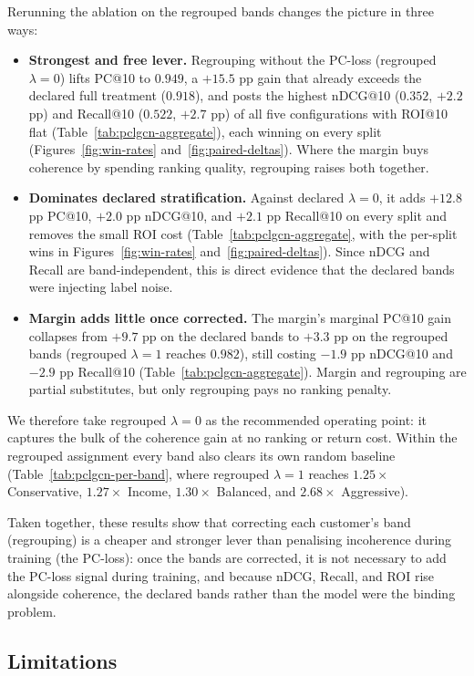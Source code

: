 Rerunning the ablation on the regrouped bands changes the picture in three ways:
\begin{itemize}
    \item \textbf{Strongest and free lever.} Regrouping without the PC-loss (regrouped $\lambda = 0$) lifts PC@10 to $0.949$, a $+15.5$ pp gain that already exceeds the declared full treatment ($0.918$), and posts the highest nDCG@10 ($0.352$, $+2.2$ pp) and Recall@10 ($0.522$, $+2.7$ pp) of all five configurations with ROI@10 flat (Table~\ref{tab:pclgcn-aggregate}), each winning on every split (Figures~\ref{fig:win-rates} and~\ref{fig:paired-deltas}). Where the margin buys coherence by spending ranking quality, regrouping raises both together.
    \item \textbf{Dominates declared stratification.} Against declared $\lambda = 0$, it adds $+12.8$ pp PC@10, $+2.0$ pp nDCG@10, and $+2.1$ pp Recall@10 on every split and removes the small ROI cost (Table~\ref{tab:pclgcn-aggregate}, with the per-split wins in Figures~\ref{fig:win-rates} and~\ref{fig:paired-deltas}). Since nDCG and Recall are band-independent, this is direct evidence that the declared bands were injecting label noise.
    \item \textbf{Margin adds little once corrected.} The margin's marginal PC@10 gain collapses from $+9.7$ pp on the declared bands to $+3.3$ pp on the regrouped bands (regrouped $\lambda = 1$ reaches $0.982$), still costing $-1.9$ pp nDCG@10 and $-2.9$ pp Recall@10 (Table~\ref{tab:pclgcn-aggregate}). Margin and regrouping are partial substitutes, but only regrouping pays no ranking penalty.
\end{itemize}
We therefore take regrouped $\lambda = 0$ as the recommended operating point: it captures the bulk of the coherence gain at no ranking or return cost. Within the regrouped assignment every band also clears its own random baseline (Table~\ref{tab:pclgcn-per-band}, where regrouped $\lambda = 1$ reaches $1.25\times$ Conservative, $1.27\times$ Income, $1.30\times$ Balanced, and $2.68\times$ Aggressive).

Taken together, these results show that correcting each customer's band (regrouping) is a cheaper and stronger lever than penalising incoherence during training (the PC-loss): once the bands are corrected, it is not necessary to add the PC-loss signal during training, and because nDCG, Recall, and ROI rise alongside coherence, the declared bands rather than the model were the binding problem.

\subsection{Limitations}
\label{sec:rq3:limitations}

